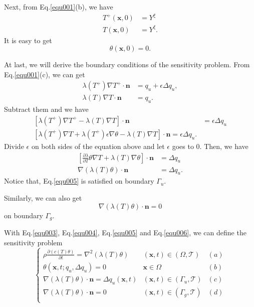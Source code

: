 \documentclass[UTF-8]{article}
\begin{document}
Next, from Eq.\ref{equ001}(b), we have
\begin{align*}
	T^+(\pmb{x},0) &= Y^\xi\\
	T(\pmb{x},0) &= Y^\xi.
\end{align*}
It is easy to get
\begin{equation}\label{equ004}
	\theta(\pmb{x},0) = 0.
\end{equation}

At last, we will derive the boundary conditions of the sensitivity problem. From Eq.\ref{equ001}(c), we can get
\begin{align*}
	\lambda(T^+) \nabla T^+ \cdot \pmb{n} &= q_u + \epsilon \Delta q_u,\\
	\lambda(T) \nabla T \cdot \pmb{n} &= q_u.
\end{align*}
Subtract them and we have
\begin{align*}
	\left[ \lambda (T^+) \nabla T^+ - \lambda(T) \nabla T \right] \cdot \pmb{n} &= \epsilon \Delta q_u\\
	\left[ \lambda (T^+) \nabla T + \lambda (T^+) \epsilon \nabla \theta - \lambda(T) \nabla T \right] \cdot \pmb{n} = \epsilon \Delta q_u.
\end{align*}
Divide $\epsilon$ on both sides of the equation above and let $\epsilon$ goes to $0$. Then, we have
\begin{align}\label{equ005}
	\left[ \frac{\partial \lambda}{\partial T} \theta \nabla T + \lambda(T) \nabla \theta \right] \cdot \pmb{n} &= \Delta q_u \nonumber \\
	\nabla\left( \lambda(T) \theta \right) \cdot \pmb{n} &= \Delta q_u.
\end{align}
Notice that, Eq.\ref{equ005} is satisfied on boundary $\Gamma_u$.

Similarly, we can also get
\begin{equation}\label{equ006}
	\nabla \left( \lambda(T) \theta \right) \cdot \pmb{n} = 0
\end{equation}
on boundary $\Gamma_g$.

With Eq.\ref{equ003}, Eq.\ref{equ004}, Eq.\ref{equ005} and Eq.\ref{equ006}, we can define the sensitivity problem
\begin{equation}\label{equ007}
	\left\{
	\begin{array}{lll}
		\rho \frac{\partial \left( c(T) \theta \right)}{\partial t} = \nabla^2 \left( \lambda(T) \theta \right) \quad &(\pmb{x},t) \in (\Omega,\mathcal{T}) &(a)\\
		\theta(\pmb{x},t;q_u,\Delta q_u) = 0 &\pmb{x}\in \Omega &(b)\\
		\nabla\left( \lambda(T) \theta \right) \cdot \pmb{n} = \Delta q_u(\pmb{x},t) &(\pmb{x},t) \in (\Gamma_u, \mathcal{T}) &(c)\\
		\nabla\left( \lambda(T) \theta \right) \cdot \pmb{n} = 0 &(\pmb{x},t) \in (\Gamma_g, \mathcal{T}) &(d)\\		
	\end{array}
	\right.
\end{equation}
\end{document}
